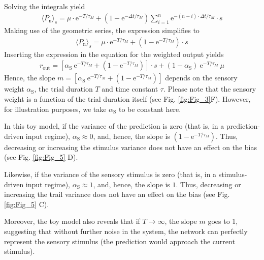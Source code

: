 \documentclass[10pt,a4paper,draft]{article}
\begin{document}
%
Solving the integrals yield
%
\begin{align}
\langle P_\mathrm{n} \rangle_s = \mu \cdot \mathrm{e}^{-T/\tau_M} + \left( 1 -   \mathrm{e}^{-\Delta t/\tau_M} \right) \sum_{i=1}^{n} \mathrm{e}^{-(n-i)\cdot \Delta t/ \tau_M} \cdot s
\end{align}
%
Making use of the geometric series, the expression simplifies to
%
\begin{align*}
\langle P_\mathrm{n} \rangle_s =  \mu \cdot \mathrm{e}^{-T/\tau_M} + \left( 1 -   \mathrm{e}^{-T/\tau_M} \right) \cdot s
\end{align*}
%
Inserting the expression in the equation for the weighted output yields
%
\begin{align*}
 r_\mathrm{out} = \left[ \alpha_\mathrm{S}\  \mathrm{e}^{-T/\tau_M} + \left( 1 -   \mathrm{e}^{-T/\tau_M} \right)\right] \cdot s + \left( 1 -\alpha_\mathrm{S} \right)\ \mathrm{e}^{-T/\tau_M}\ \mu
\end{align*}
%
Hence, the slope $  m = \left[ \alpha_\mathrm{S}\  \mathrm{e}^{-T/\tau_M} + \left( 1 -   \mathrm{e}^{-T/\tau_M} \right)\right] $ depends on the sensory weight $\alpha_\mathrm{S}$, the trial duration $T$ and time constant $\tau$. Please note that the sensory weight is a function of the trial duration itself (see Fig. \ref{fig:Fig_3}F). However, for illustration purposes, we take $\alpha_\mathrm{S}$ to be constant here.
 
In this toy model, if the variance of the prediction is zero (that is, in a prediction-driven input regime), $\alpha_\mathrm{S} \approx 0$, and, hence, the slope is $\left( 1 -   \mathrm{e}^{-T/\tau_M} \right)$.  Thus, decreasing or increasing the stimulus variance does not have an effect on the bias (see Fig. \ref{fig:Fig_5} D).

Likewise, if the variance of the sensory stimulus is zero (that is, in a stimulus-driven input regime), $\alpha_\mathrm{S} \approx 1$, and, hence, the slope is $1$. Thus, decreasing or increasing the trail variance does not have an effect on the bias (see Fig. \ref{fig:Fig_5} C).

Moreover, the toy model also reveals that if $T\rightarrow \infty$, the slope $m$ goes to 1, suggesting that without further noise in the system, the network can perfectly represent the sensory stimulus (the prediction would approach the current stimulus). 
\end{document}
